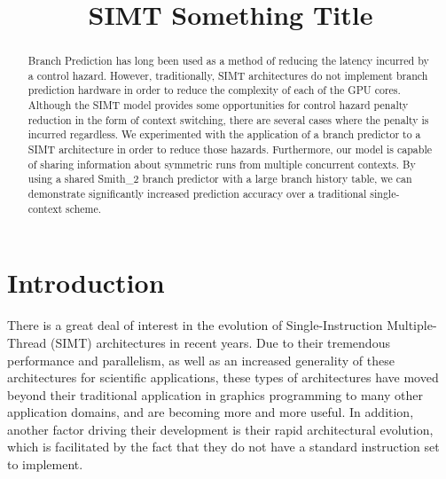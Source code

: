 \documentclass[conference]{IEEEtran}
\begin{document}
%
\title{SIMT Something Title}


\author{
\and{}
}

\maketitle

\begin{abstract} 

Branch Prediction has long been used as a method of reducing the latency incurred by a control hazard.  However, traditionally, SIMT architectures 
do not implement branch prediction hardware in order to reduce the complexity of each of the GPU cores.  Although the SIMT model provides some 
opportunities for control hazard penalty reduction in the form of context switching, there are several cases where the penalty is incurred regardless.
We experimented with the application of a branch predictor to a SIMT architecture in order to reduce those hazards.  Furthermore, our model is 
capable of sharing information about symmetric runs from multiple concurrent contexts.  By using a shared Smith\_2 branch predictor with a large branch history table,
we can demonstrate significantly increased prediction accuracy over a traditional single-context scheme.

\end{abstract}

\IEEEpeerreviewmaketitle


\section{Introduction}
There is a great deal of interest in the evolution of Single-Instruction Multiple-Thread (SIMT) architectures in recent years.  Due to
their tremendous performance and parallelism, as well as an increased generality of these architectures for scientific applications, these 
types of architectures have moved beyond their traditional application in graphics programming to many other application domains, and are becoming more and more useful.
In addition, another factor driving their development is their rapid architectural evolution, which is facilitated by the fact that they do not have a standard instruction set
to implement.  
\end{document}
